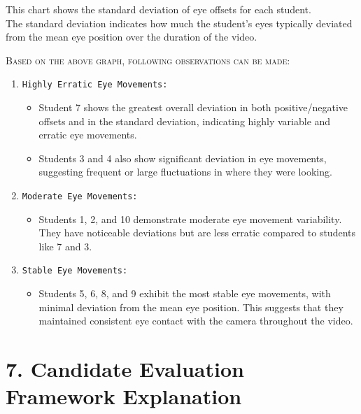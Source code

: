\documentclass{article}
\begin{document}
This chart shows the standard deviation of eye offsets for each student.\\
The standard deviation indicates how much the student's eyes typically deviated from the mean eye position over the duration of the video.


\textsc{Based on the above graph, following observations can be made:}
\begin{enumerate}
    \item \texttt{Highly Erratic Eye Movements:} {
        \begin{itemize}
            \item {Student 7 shows the greatest overall deviation in both positive/negative offsets and in the standard deviation, indicating highly variable and erratic eye movements.}
            \item {Students 3 and 4 also show significant deviation in eye movements, suggesting frequent or large fluctuations in where they were looking.
            }
        \end{itemize}
    }
    \item \texttt{Moderate Eye Movements:} {
        \begin{itemize}
            \item {Students 1, 2, and 10 demonstrate moderate eye movement variability. They have noticeable deviations but are less erratic compared to students like 7 and 3.
            }
        \end{itemize}
    }
    \item \texttt{Stable Eye Movements:} {
        \begin{itemize}
            \item {Students 5, 6, 8, and 9 exhibit the most stable eye movements, with minimal deviation from the mean eye position. This suggests that they maintained consistent eye contact with the camera throughout the video.
            }
        \end{itemize}
    }
\end{enumerate}




\section{7. Candidate Evaluation Framework Explanation}
\end{document}
